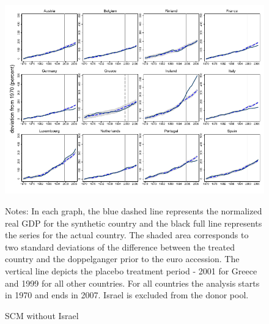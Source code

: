 \documentclass[12pt]{article}
\newcommand{\annote}[1]{\parbox{\textwidth}{\renewcommand{\baselinestretch}{1.0}\vspace{12pt} \small Notes: #1}}
\begin{document}
\begin{appendices}
\begin{figure}[h!]
    \centering
    \label{F_ISR}
    \caption{SCM without Israel}
    \includegraphics[scale=0.7]{Output/Figures/SCM_gdp_Rob_1999_Annual_ISR.pdf}
         \annote{In each graph, the blue dashed line represents the normalized real GDP for the synthetic country and the black full line represents the series for the actual country. The shaded area corresponds to two standard deviations of the difference between the treated country and the doppelganger prior to the euro accession. The vertical line depicts the placebo treatment period - 2001 for Greece and 1999 for all other countries. For all countries the analysis starts in 1970 and ends in 2007. Israel is excluded from the donor pool. }
\end{figure}


\end{appendices}
\end{document}
